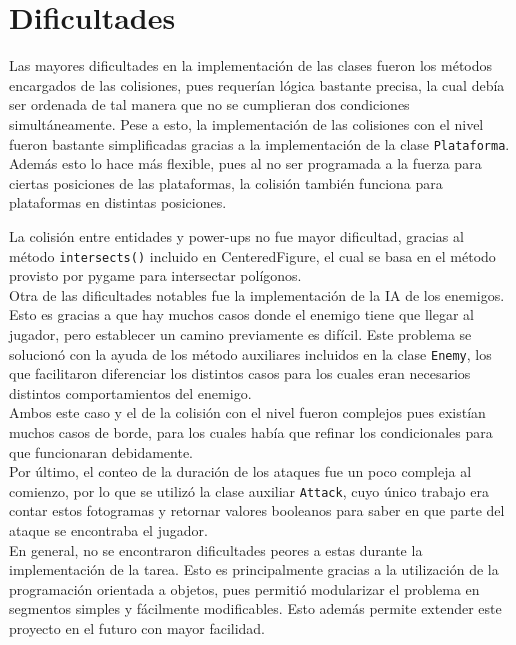 \documentclass[letterpaper,11pt]{article} %
\begin{document}
\section{Dificultades}
	Las mayores dificultades en la implementación de las clases fueron los métodos encargados de las colisiones, pues requerían lógica bastante precisa, la cual debía ser ordenada de tal manera que no se cumplieran dos condiciones simultáneamente. Pese a esto, la implementación de las colisiones con el nivel fueron bastante simplificadas gracias a la implementación de la clase \verb!Plataforma!. Además esto lo hace más flexible, pues al no ser programada a la fuerza para ciertas posiciones de las plataformas, la colisión también funciona para plataformas en distintas posiciones\footnotemark.\\
	
	La colisión entre entidades y power-ups no fue mayor dificultad, gracias al método \verb+intersects()+ incluido en CenteredFigure, el cual se basa en el método provisto por pygame para intersectar polígonos.\\

	Otra de las dificultades notables fue la implementación de la IA de los enemigos. Esto es gracias a que hay muchos casos donde el enemigo tiene que llegar al jugador, pero establecer un camino previamente es difícil. Este problema se solucionó con la ayuda de los método auxiliares incluidos en la clase \verb!Enemy!, los que facilitaron diferenciar los distintos casos para los cuales eran necesarios distintos comportamientos del enemigo.\\

	Ambos este caso y el de la colisión con el nivel fueron complejos pues existían muchos casos de borde, para los cuales había que refinar los condicionales para que funcionaran debidamente.\\

	Por último, el conteo de la duración de los ataques fue un poco compleja al comienzo, por lo que se utilizó la clase auxiliar \verb!Attack!, cuyo único trabajo era contar estos fotogramas y retornar valores booleanos para saber en que parte del ataque se encontraba el jugador.\\

	En general, no se encontraron dificultades peores a estas durante la implementación de la tarea. Esto es principalmente gracias a la utilización de la programación orientada a objetos, pues permitió modularizar el problema en segmentos simples y fácilmente modificables. Esto además permite extender este proyecto en el futuro con mayor facilidad.
\end{document}
